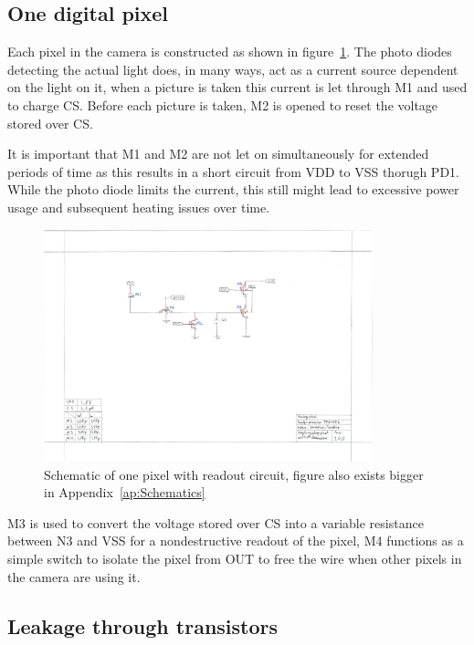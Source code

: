 
\subsection{One digital pixel}


Each pixel in the camera is constructed as shown in figure~\ref{fig:pixelschematic}.
The photo diodes detecting the actual light does, in many ways, act as a current source dependent on the light on it, when a picture is taken this
current is let through M1 and used to charge CS.
Before each picture is taken, M2 is opened to reset the voltage stored over CS.

It is important that M1 and M2 are not let on simultaneously for extended periods of time as this results in a short circuit from VDD to VSS thorugh PD1.
While the photo diode limits the current, this still might lead to excessive power usage and subsequent heating issues over time.


\begin{figure}[htbp]
  \centering
  \includegraphics[width=0.85\textwidth]{figures/SchematicPixel}
  \caption{Schematic of one pixel with readout circuit, figure also exists bigger in Appendix~\ref{ap:Schematics}}\label{fig:pixelschematic}
\end{figure}


M3 is used to convert the voltage stored over CS into a variable resistance between N3 and VSS for a nondestructive readout of the pixel,
M4 functions as a simple switch to isolate the pixel from OUT to free the wire when other pixels in the camera are using it.



\subsection{Leakage through transistors}

